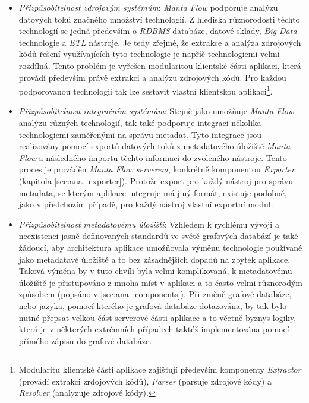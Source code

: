 \begin{itemize}
	\item{\textit{Přizpůsobitelnost zdrojovým systémům}}: \textit{Manta Flow} podporuje analýzu datových toků značného množství technologií. Z hlediska různorodosti těchto technologií se jedná především o \textit{RDBMS} databáze, datové sklady, \textit{Big Data} technologie a \textit{ETL} nástroje. Je tedy zřejmé, že extrakce a analýza zdrojových kódů řešení využívajících tyto technologie je napříč technologiemi velmi rozdílná. Tento problém je vyřešen modularitou klientské části aplikaci, která provádí především právě extrakci a analýzu zdrojových kódů. Pro každou podporovanou technologii tak lze sestavit vlastní klientskou aplikaci\footnote{Modularitu klientské části aplikace zajišťují především komponenty \textit{Extractor} (provádí extrakci zrdojových kódů), \textit{Parser} (parsuje zdrojové kódy) a \textit{Resolver} (analyzuje zdrojové kódy).}.

	\item{\textit{Přizpůsobitelnost integračním systémům}}: Stejně jako umožňuje \textit{Manta Flow} analýzu různých technologií, tak také podporuje integraci několika technologiemi zaměřenými na správu metadat. Tyto integrace jsou realizovány pomocí exportů datových toků z metadatového úložiště \textit{Manta Flow} a následného importu těchto informací do zvoleného nástroje. Tento proces je prováděn \textit{Manta Flow serverem}, konkrétně komponentou \textit{Exporter} (kapitola \ref{sec:ana_exporter}). Protože export pro každý nástroj pro správu metadata, se kterým aplikace integruje má jiný formát, existuje podobně, jako v předchozím případě, pro každý nástroj vlastní exportní modul.

	\item{\textit{Přizpůsobitelnost metadatovému úložišti}}: Vzhledem k rychlému vývoji a neexistenci jasně definovaných standardů ve světě grafových databází je také žádoucí, aby architektura aplikace umožňovala výměnu technologie používané jako metadatavé úložiště a to bez zásadnějších dopadů na zbytek aplikace. Taková výměna by v tuto chvíli byla velmi komplikovaná, k metadatovému úložiště je přistupováno z mnoha míst v aplikaci a to často velmi různorodým způsobem (popsáno v \ref{sec:ana_components}). Při změně grafové databáze, nebo jazyka, pomocí kterého je grafová databáze dotazována, by tak bylo nutné přepsat velkou část serverové části aplikace a to včetně byznys logiky, která je v některých extrémních případech taktéž implementována pomocí přímého zápisu do grafové databáze.


\end{itemize}
